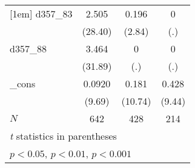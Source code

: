 {\begin{tabular}{l*{3}{c}}
[1em]
d357\_83     &       2.505\sym{***}&       0.196\sym{**} &           0         \\
            &     (28.40)         &      (2.84)         &         (.)         \\
[1em]
d357\_88     &       3.464\sym{***}&           0         &           0         \\
            &     (31.89)         &         (.)         &         (.)         \\
[1em]
\_cons      &      0.0920\sym{***}&       0.181\sym{***}&       0.428\sym{***}\\
            &      (9.69)         &     (10.74)         &      (9.44)         \\
\hline
\(N\)       &         642         &         428         &         214         \\
\hline\hline
\multicolumn{4}{l}{\footnotesize \textit{t} statistics in parentheses}\\
\multicolumn{4}{l}{\footnotesize \sym{*} \(p<0.05\), \sym{**} \(p<0.01\), \sym{***} \(p<0.001\)}\\
\end{tabular}
}
